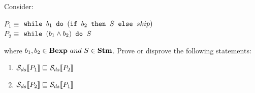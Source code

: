 \newcommand{\and}{\wedge}

\newcommand{\exEightA}
{$ \wbS{b_1}{(\ifABC{b_2}{S}{skip})} $}

\newcommand{\exEightB}
{$  \wbS{(b_1 \and b_2)}{S} $}

{
    Consider: 
    \begin{center}
    $ P_1 \equiv $ \exEightA \\
    $ P_2 \equiv $ \exEightB
    \end{center}
    where $ b_1, b_2 \in\mbox{\textbf{Bexp}}~and~S\in\mbox{\textbf{Stm}}$. Prove or disprove the following
    statements: 
    \begin{enumerate}
    \item $\mathcal{S}_{ds}\llbracket P_1 \rrbracket \sqsubseteq \mathcal{S}_{ds}\llbracket P_2 \rrbracket$
    \item $\mathcal{S}_{ds}\llbracket P_2 \rrbracket \sqsubseteq \mathcal{S}_{ds}\llbracket P_1 \rrbracket$
    \end{enumerate}
}
